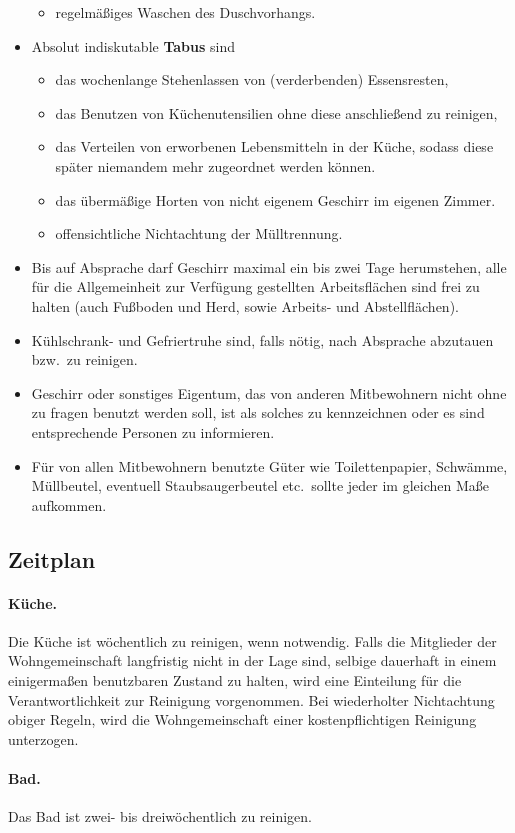 \documentclass{article}
\begin{document}
\begin{itemize}
\begin{itemize}
            \item regelmäßiges Waschen des Duschvorhangs.
    \end{itemize}
        \item Absolut indiskutable \textbf{Tabus} sind
    \begin{itemize}
            \item das wochenlange Stehenlassen von (verderbenden) Essensresten,
            \item das Benutzen von Küchenutensilien ohne diese anschließend zu reinigen,
            \item das Verteilen von erworbenen Lebensmitteln in der Küche, sodass diese später niemandem mehr zugeordnet werden können.
            \item das übermäßige Horten von nicht eigenem Geschirr im eigenen Zimmer.
            \item offensichtliche Nichtachtung der Mülltrennung.
    \end{itemize}
        \item Bis auf Absprache darf Geschirr maximal ein bis zwei Tage herumstehen, alle für die Allgemeinheit zur Verfügung gestellten Arbeitsflächen sind frei zu halten (auch Fußboden und Herd, sowie Arbeits- und Abstellflächen).
        \item Kühlschrank- und Gefriertruhe sind, falls nötig, nach Absprache abzutauen bzw.\ zu reinigen.
        \item Geschirr oder sonstiges Eigentum, das von anderen Mitbewohnern nicht ohne zu fragen benutzt werden soll, ist als solches zu kennzeichnen oder es sind entsprechende Personen zu informieren.
        \item Für von allen Mitbewohnern benutzte Güter wie Toilettenpapier, Schwämme, Müllbeutel, eventuell Staubsaugerbeutel etc.\ sollte jeder im gleichen Maße aufkommen.
\end{itemize}

\subsection*{Zeitplan}

\paragraph{Küche.} Die Küche ist wöchentlich zu reinigen, wenn notwendig. Falls die Mitglieder der Wohngemeinschaft langfristig nicht in der Lage sind, selbige dauerhaft in einem einigermaßen benutzbaren Zustand zu halten, wird eine Einteilung für die Verantwortlichkeit zur Reinigung vorgenommen.
Bei wiederholter Nichtachtung obiger Regeln, wird die Wohngemeinschaft einer kostenpflichtigen Reinigung unterzogen.

\paragraph{Bad.} Das Bad ist zwei- bis dreiwöchentlich zu reinigen. 
\end{document}
